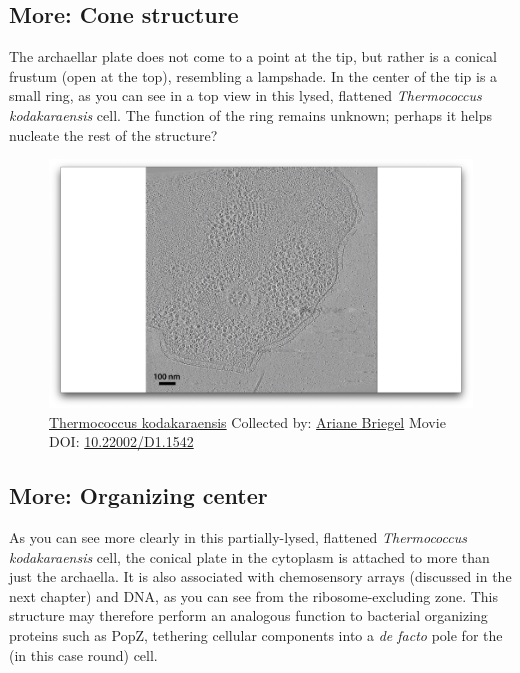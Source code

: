 \documentclass[]{tufte-book}
\begin{document}
\hypertarget{Cone_structure}{\subsection*{More: Cone
structure}\label{Cone_structure}}

The archaellar plate does not come to a point at the tip, but rather is
a conical frustum (open at the top), resembling a lampshade. In the
center of the tip is a small ring, as you can see in a top view in this
lysed, flattened \emph{Thermococcus kodakaraensis} cell. The function of
the ring remains unknown; perhaps it helps nucleate the rest of the
structure?





\begin{figure}
\includegraphics{movie_stills/6_9a} \caption[\protect\hyperlink{tree}{Thermococcus kodakaraensis}
Collected by: \protect\hyperlink{ariane_briegel}{Ariane Briegel} Movie
DOI: \href{https://doi.org/10.22002/D1.1542}{10.22002/D1.1542}]{\protect\hyperlink{tree}{Thermococcus kodakaraensis}
Collected by: \protect\hyperlink{ariane_briegel}{Ariane Briegel} Movie
DOI: \href{https://doi.org/10.22002/D1.1542}{10.22002/D1.1542}}\label{fig:6-9a}
\end{figure}

\hypertarget{Organizing_center}{\subsection*{More: Organizing
center}\label{Organizing_center}}

As you can see more clearly in this partially-lysed, flattened
\emph{Thermococcus kodakaraensis} cell, the conical plate in the
cytoplasm is attached to more than just the archaella. It is also
associated with chemosensory arrays (discussed in the next chapter) and
DNA, as you can see from the ribosome-excluding zone. This structure may
therefore perform an analogous function to bacterial organizing proteins
such as PopZ, tethering cellular components into a \emph{de facto} pole
for the (in this case round) cell.
\end{document}
